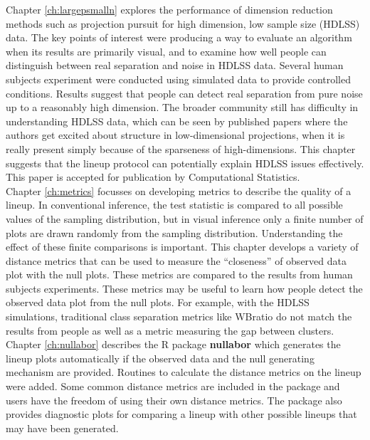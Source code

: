 Chapter \ref{ch:largepsmalln} explores the performance of dimension reduction methods such as  projection pursuit for high dimension, low sample size (HDLSS) data. The key points of interest were producing a way to evaluate an algorithm when its results are primarily visual, and to examine how well people can distinguish between real separation and noise in HDLSS data.  Several human subjects experiment were conducted using simulated data to provide controlled conditions. Results suggest that people can detect real separation from pure noise up to a reasonably high dimension. The broader community still has difficulty in understanding HDLSS data, which can be seen by published papers where the authors get excited about structure in low-dimensional projections, when it is really present simply because of the sparseness of high-dimensions. This chapter suggests that the lineup protocol can potentially explain HDLSS issues effectively. This paper is accepted for publication by Computational Statistics. \\

Chapter \ref{ch:metrics} focusses on developing metrics to describe the quality of a lineup. In conventional inference, the test statistic is compared to all possible values of the sampling distribution, but in visual inference only a finite number of plots are drawn randomly from the sampling distribution. Understanding the effect of these finite comparisons is important. This chapter develops a variety of distance metrics that can be used to measure the ``closeness'' of observed data plot with the null plots. These metrics are compared to the results from human subjects experiments. These metrics may be useful to learn how people detect the observed data plot from the null plots. For example, with the HDLSS simulations, traditional class separation metrics like WBratio do not match the results from people as well as a metric measuring the gap between clusters. \\

Chapter \ref{ch:nullabor} describes the R package \textbf{nullabor} which generates the lineup plots automatically if the observed data and the null generating mechanism are provided. Routines to calculate the distance metrics on the lineup were added. Some common distance metrics are included in the package and users have the freedom of using their own distance metrics. The package also provides diagnostic plots for comparing a lineup with other possible lineups that may have been generated. \\

